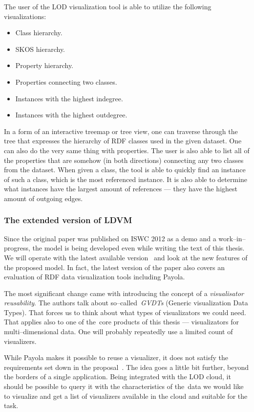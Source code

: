 The user of the LOD visualization tool is able to utilize the following 
visualizations:

\begin{itemize}
\item Class hierarchy.
\item SKOS hierarchy.
\item Property hierarchy.
\item Properties connecting two classes.
\item Instances with the highest indegree.
\item Instances with the highest outdegree.
\end{itemize}

In a form of an interactive treemap or tree view, one 
can traverse through the tree that expresses the hierarchy of RDF classes used 
in the given dataset. One can also do the very same thing with properties. The 
user is also able to list all of the properties that are somehow (in both directions)
connecting any two classes from the dataset. When given a class, the tool is 
able to quickly find an instance of such a class, which is the most referenced
instance. It is also able to determine what instances have the largest amount of references
--- they have the highest amount of outgoing
edges.

\subsubsection{The extended version of LDVM}
Since the original paper was published on ISWC 2012 as a demo and a
work--in--progress, the model is being developed even while writing the text of 
this thesis. We will operate with the latest available version~\cite{ldvm2} and look 
at the new features of the proposed model. In fact, the latest version of the 
paper also covers an evaluation of RDF data visualization tools including 
Payola.

The most significant change came with introducing the concept of a \emph{visualisator 
reusability}. The authors talk about so--called~\emph{GVDTs} (Generic visualization Data Types).
That forces us to think about what types of visualizators we could need. That applies also to
one of the~core products of this thesis --- visualizators for multi--dimensional data.
One will probably repeatedly use a limited count of visualizers.

While Payola makes it possible to reuse a visualizer, it does not satisfy the 
requirements set down in the proposal~\cite{ldvm2}. The idea goes a little bit 
further, beyond the borders of a single application. Being integrated with the 
LOD cloud, it should be possible to query it with the characteristics of 
the~data we would like to visualize and get a list of visualizers 
available in the cloud and suitable for the task.

